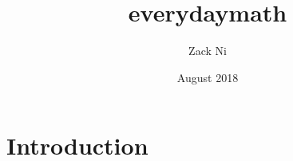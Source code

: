 \documentclass{article}
\title{everydaymath}
\author{Zack Ni }
\date{August 2018}
\begin{document}
\maketitle

\section{Introduction}
\end{document}
